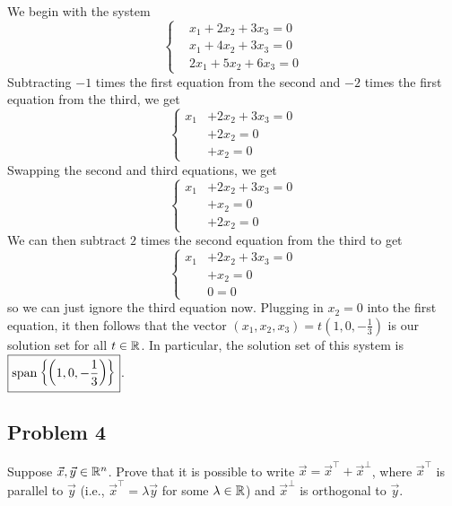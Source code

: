 \documentclass[main.tex]{subfiles}
\begin{document}
\begin{soln}
    We begin with the system
    \[\left\{\begin{aligned}
        &x_1 + 2x_2 + 3x_3 = 0 \\
        &x_1 + 4x_2 + 3x_3 = 0 \\
        &2x_1 + 5x_2 + 6x_3 = 0
    \end{aligned}\right.\]
    Subtracting $-1$ times the first equation from the second and $-2$ times the first equation from the third, we get
    \[\left\{\begin{aligned}
        x_1 &+ 2x_2 + 3x_3 = 0 \\
        &+ 2x_2 = 0 \\
        &+ x_2 = 0
    \end{aligned}\right.\]
    Swapping the second and third equations, we get
    \[\left\{\begin{aligned}
        x_1 &+ 2x_2 + 3x_3 = 0 \\
        &+ x_2 = 0 \\
        &+ 2x_2 = 0
    \end{aligned}\right.\]
    We can then subtract $2$ times the second equation from the third to get
    \[\left\{\begin{aligned}
        x_1 &+ 2x_2 + 3x_3 = 0 \\
        &+ x_2 = 0 \\
        &0 = 0
    \end{aligned}\right.\]
    so we can just ignore the third equation now. Plugging in $x_2 = 0$ into the first equation, it then follows that the vector $(x_1, x_2, x_3) = t\left(1, 0, -\frac{1}{3}\right)$ is our solution set for all $t\in \mathbb R$. In particular, the solution set of this system is $\boxed{\operatorname{span}\left\{\left(1, 0, -\frac{1}{3}\right)\right\}}$.
\end{soln}
\eject

\subsection{Problem 4}
\begin{claim}
    Suppose $\vec{x}, \vec{y} \in \mathbb R^n$. Prove that it is possible to write $\vec{x} = \vec{x}^\top + \vec{x}^\perp$, where $\vec{x}^\top$ is parallel to $\vec{y}$ (i.e., $\vec{x}^\top = \lambda\vec{y}$ for some $\lambda \in \mathbb R$) and $\vec{x}^\perp$ is orthogonal to $\vec{y}$.
\end{claim}
\end{document}
